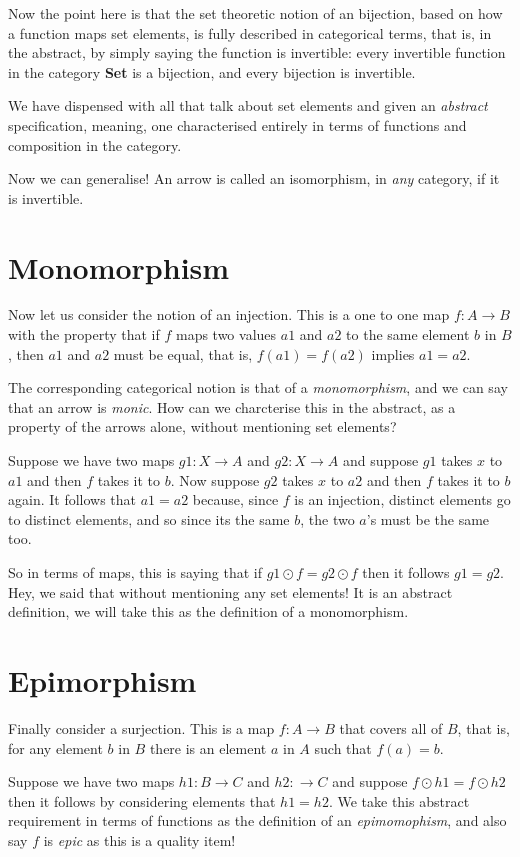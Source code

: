 \documentclass[oneside]{book}
\theoremstyle{plain}
\theoremstyle{definition}
\theoremstyle{plain}
\begin{document}
Now the point here is that the set theoretic notion of an bijection,
based on how a function maps set elements, is fully described
in categorical terms, that is, in the abstract, by simply saying
the function is invertible: every invertible function in the category
{\bf Set} is a bijection, and every bijection is invertible.

We have dispensed with all that talk about set elements and given
an {\em abstract} specification, meaning, one characterised entirely
in terms of functions and composition in the category.

Now we can generalise! An arrow is called an isomorphism,
in {\em any} category, if it is invertible. 

\section{Monomorphism}
Now let us consider the notion of an injection. This is a one to one map 
$f:A \rightarrow B$ 
with the property that if $f$ maps two values $a1$ and $a2$ to the same
element $b$ in $B$, then $a1$ and $a2$ must be equal, that is, 
$f(a1) = f(a2)$ implies $a1=a2$.

The corresponding categorical notion is that of a {\em monomorphism},
and we can say that an arrow is {\em monic}. How can we charcterise
this in the abstract, as a property of the arrows alone, without
mentioning set elements?

Suppose we have two maps $g1:X\rightarrow A$ and $g2:X\rightarrow A$
and suppose $g1$ takes $x$ to $a1$ and then $f$ takes it to $b$.
Now suppose $g2$ takes $x$ to $a2$ and then $f$ takes it to $b$ again.
It follows that $a1=a2$ because, since $f$ is an injection, distinct
elements go to distinct elements, and so since its the same $b$,
the two $a$'s must be the same too.

So in terms of maps, this is saying that if $g1 \odot f = g2 \odot f$ then
it follows $g1 = g2$. Hey, we said that without mentioning any set elements!
It is an abstract definition, we will take this as the definition
of a monomorphism.
 

\section{Epimorphism}
Finally consider a surjection. This is a map $f:A\rightarrow B$ that covers
all of $B$, that is, for any element $b$ in $B$ there is an element $a$ in $A$
such that $f(a)=b$.

Suppose we have two maps $h1:B\rightarrow C$ and $h2:\rightarrow C$ and suppose
$f \odot h1 = f \odot h2$ then it follows by considering elements
that $h1=h2$. We take this abstract requirement in terms of functions
as the definition of an {\em epimomophism}, and also say $f$ is {\em epic}
as this is a quality item!
\end{document}
